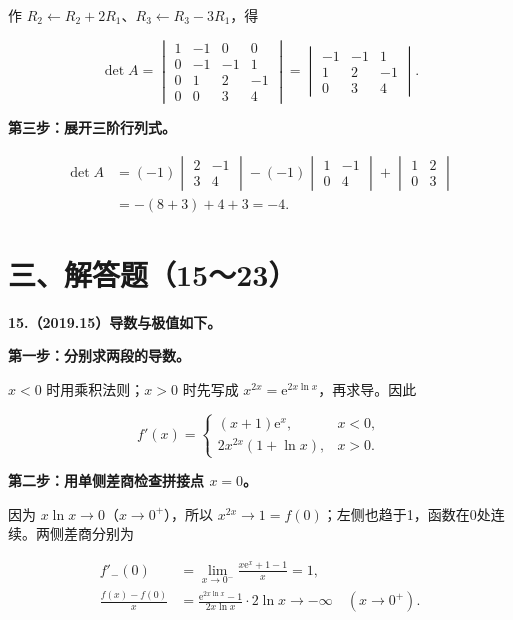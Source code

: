 \documentclass[UTF8,11pt,fontset=windows]{ctexart}
\begin{document}
作 $R_2\leftarrow R_2+2R_1$、$R_3\leftarrow R_3-3R_1$，得

$$
\det A=
\begin{vmatrix}
1&-1&0&0\\0&-1&-1&1\\0&1&2&-1\\0&0&3&4
\end{vmatrix}
=\begin{vmatrix}-1&-1&1\\1&2&-1\\0&3&4\end{vmatrix}.
$$

\textbf{第三步：展开三阶行列式。}

$$
\begin{aligned}
\det A
&=(-1)\begin{vmatrix}2&-1\\3&4\end{vmatrix}
 -(-1)\begin{vmatrix}1&-1\\0&4\end{vmatrix}
 +\begin{vmatrix}1&2\\0&3\end{vmatrix}\\
&=-(8+3)+4+3=\boxed{-4}.
\end{aligned}
$$

\clearpage

\section*{三、解答题（15～23）}

\textbf{15.（2019.15）导数与极值如下。}

\textbf{第一步：分别求两段的导数。}

$x<0$ 时用乘积法则；$x>0$ 时先写成 $x^{2x}=\mathrm e^{2x\ln x}$，再求导。因此

$$
f'(x)=\begin{cases}
(x+1)\mathrm e^x,&x<0,\\[2pt]
2x^{2x}(1+\ln x),&x>0.
\end{cases}
$$

\textbf{第二步：用单侧差商检查拼接点 $x=0$。}

因为 $x\ln x\to0$（$x\to0^+$），所以 $x^{2x}\to1=f(0)$；左侧也趋于1，函数在0处连续。两侧差商分别为

$$
\begin{aligned}
f'_-(0)&=\lim_{x\to0^-}\frac{x\mathrm e^x+1-1}{x}=1,\\
\frac{f(x)-f(0)}x
&=\frac{\mathrm e^{2x\ln x}-1}{2x\ln x}\cdot2\ln x
\longrightarrow-\infty\quad(x\to0^+).
\end{aligned}
$$
\end{document}
